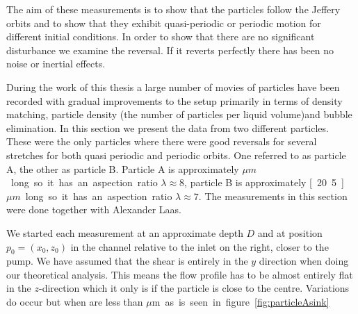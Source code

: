 The aim of these measurements is to show that the particles follow the Jeffery orbits and to show that they exhibit quasi-periodic or periodic motion for different initial conditions. In order to show that there are no significant disturbance we examine the reversal. If it reverts perfectly there has been no noise or inertial effects.

During the work of this thesis a large number of movies of particles have been recorded with gradual improvements to the setup primarily in terms of density matching, particle density (the number of particles per liquid volume)and  bubble elimination. In this section we present the data from two different particles. These were the only particles where there were good reversals for several stretches for both quasi periodic and periodic orbits. One referred to as particle A, the other as particle B. Particle A is approximately \unit[24]{$\mu m$} long so it has an aspection ratio $\lambda \approx 8$, particle B is approximately \unit[20.5]{$\mu m$} long so it has an aspection ratio $\lambda \approx 7$. The measurements in this section were done together with Alexander Laas.

We started each measurement at an approximate depth $D$ and at position $p_0 = (x_0, z_0)$ in the channel relative to the inlet on the right, closer to the pump. We have assumed that the shear is entirely in the $y$ direction when doing 	our theoretical analysis. This means the flow profile has to be almost entirely flat in the $z$-direction which it only is if the particle is close to the centre. Variations do occur but when are less than \unit[10]{$\mu$m} as is seen in figure \ref{fig:particleAsink}.

\newpage